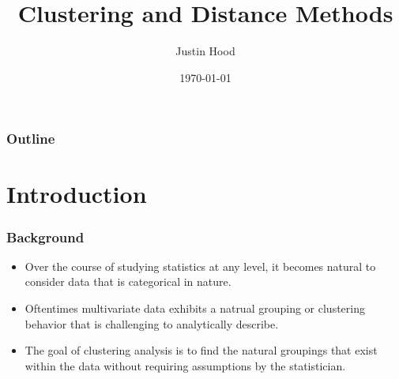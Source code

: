\documentclass{beamer}
\title[Clustering Project]{Clustering and Distance Methods} %
\author{Justin Hood} %
\institute[UW-Stout] %
{
University of Wisconsin-Stout \\ %
\medskip
\textit{hoodj5402@uwstout.edu} %
}
\date{\today} %
\begin{document}
\begin{frame}
\titlepage %
\end{frame}

\begin{frame}
\frametitle{Outline} %
\tableofcontents %
\end{frame}


\section{Introduction} %


\begin{frame}
\frametitle{Background}
\begin{itemize}
\item Over the course of studying statistics at any level, it becomes natural to consider data that is categorical in nature.
\pause
\item Oftentimes multivariate data exhibits a natrual grouping or clustering behavior that is challenging to analytically describe.
\pause
\item The goal of clustering analysis is to find the natural groupings that exist within the data without requiring assumptions by the statistician.
\end{itemize}
\end{frame}
\end{document}
